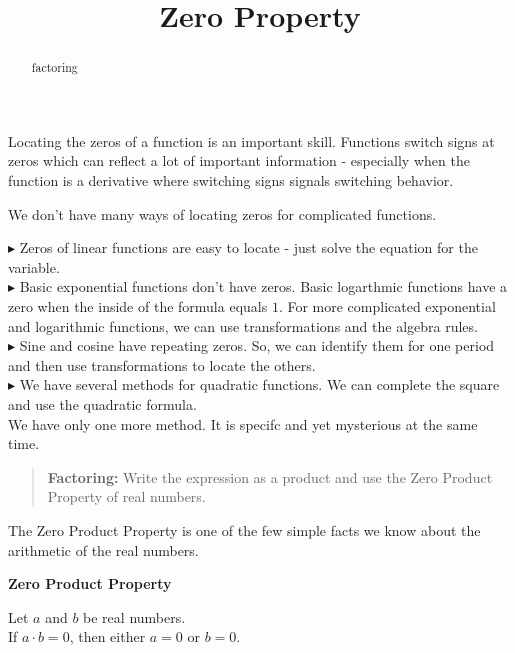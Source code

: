 \documentclass{ximera}
\title{Zero Property}
\begin{document}
\begin{abstract}
factoring
\end{abstract}
\maketitle




Locating the zeros of a function is an important skill.  Functions switch signs at zeros which can reflect a lot of important information  - especially when the function is a derivative where switching signs signals switching behavior.

We don't have many ways of locating zeros for complicated functions.


\textbf{\textcolor{blue!55!black}{$\blacktriangleright$}} Zeros of linear functions are easy to locate - just solve the equation for the variable. \\


\textbf{\textcolor{blue!55!black}{$\blacktriangleright$}} Basic exponential functions don't have zeros.  Basic logarthmic functions have a zero when the inside of the formula equals $1$. For more complicated exponential and logarithmic functions, we can use transformations and the algebra rules. \\

\textbf{\textcolor{blue!55!black}{$\blacktriangleright$}} Sine and cosine have repeating zeros. So, we can identify them for one period and then use transformations to locate the others. \\

\textbf{\textcolor{blue!55!black}{$\blacktriangleright$}} We have several methods for quadratic functions.  We can complete the square and use the quadratic formula. \\



We have only one more method.  It is specifc and yet mysterious at the same time.



\begin{quote}
\textbf{Factoring: } Write the expression as a product and use the Zero Product Property of real numbers.
\end{quote}



The Zero Product Property is one of the few simple facts we know about the arithmetic of the real numbers.


\begin{definition} \textbf{\textcolor{green!50!black}{Zero Product Property}}  

Let $a$ and $b$ be real numbers. \\

If $a \cdot b = 0$, then either $a=0$ or $b=0$.


\end{definition}
\end{document}
